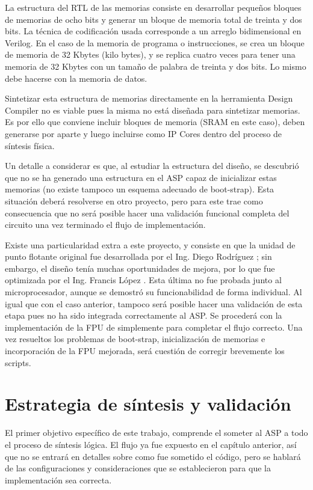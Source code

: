 La estructura del RTL de las memorias consiste en desarrollar pequeños bloques de memorias de ocho bits y generar un bloque de memoria total de treinta y dos bits. La técnica de codificación usada corresponde a un arreglo bidimensional en Verilog. En el caso de la memoria de programa o instrucciones, se crea un bloque de memoria de 32 Kbytes (kilo bytes), y se replica cuatro veces para tener una memoria de 32 Kbytes con un tamaño de palabra de treinta y dos bits. Lo mismo debe hacerse con la memoria de datos. 

Sintetizar esta estructura de memorias directamente en la herramienta Design Compiler no es viable pues la misma no está diseñada para sintetizar memorias. Es por ello que conviene incluir bloques de memoria (SRAM en este caso), deben generarse por aparte y luego incluirse como IP Cores dentro del proceso de síntesis física.

Un detalle a considerar es que, al estudiar la estructura del diseño, se descubrió que no se ha generado una estructura en el ASP capaz de inicializar estas memorias (no existe tampoco un esquema adecuado de boot-strap).  Esta situación deberá resolverse en otro proyecto, pero para este trae como consecuencia que no será posible hacer una validación funcional completa del circuito una vez terminado el flujo de implementación. 

Existe una particularidad extra a este proyecto, y consiste en que la unidad de punto flotante original fue desarrollada por el Ing. Diego Rodríguez \cite{Diego2015}; sin embargo, el diseño tenía muchas oportunidades de mejora, por lo que fue optimizada por el Ing. Francis López \cite{Francis2016}. Esta última no fue probada junto al microprocesador, aunque se demostró su funcionabilidad de forma individual. Al igual que con el caso anterior, tampoco será posible hacer una validación de esta etapa pues no ha sido integrada correctamente al ASP. Se procederá con la implementación de la FPU de \cite{Diego2015} simplemente para completar el flujo correcto. Una vez resueltos los problemas de boot-strap, inicialización de memorias e incorporación de la FPU mejorada, será cuestión de corregir brevemente los scripts.

\section{Estrategia de síntesis y validación}

El primer objetivo específico de este trabajo, comprende el someter al ASP a todo el proceso de síntesis lógica. El flujo ya fue expuesto en el capítulo anterior, así que no se entrará en detalles sobre como fue sometido el código, pero se hablará de las configuraciones y consideraciones que se establecieron para que la implementación sea correcta.

